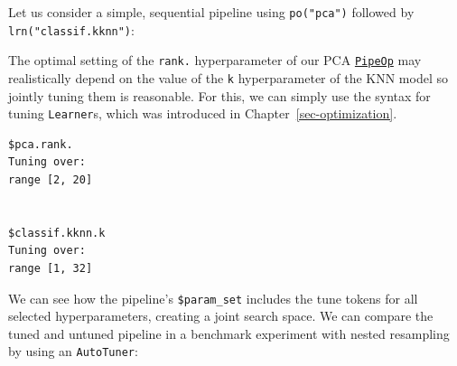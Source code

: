 Let us consider a simple, sequential pipeline using \texttt{po("pca")}
followed by \texttt{lrn("classif.kknn")}:

\begin{Shaded}
\begin{Highlighting}[]
\OtherTok{=} \NormalTok{(}\NormalTok{(}\NormalTok{) }\SpecialCharTok{\%\textgreater{}\textgreater{}\%} \NormalTok{(}\NormalTok{))}
\end{Highlighting}
\end{Shaded}

The optimal setting of the \texttt{rank.} hyperparameter of our PCA
\href{https://mlr3pipelines.mlr-org.com/reference/PipeOp.html}{\texttt{PipeOp}}
may realistically depend on the value of the \texttt{k} hyperparameter
of the KNN model so jointly tuning them is reasonable. For this, we can
simply use the syntax for tuning \texttt{Learner}s, which was introduced
in Chapter~\ref{sec-optimization}.

\begin{Shaded}
\begin{Highlighting}[]
\OtherTok{=} \NormalTok{(}\NormalTok{, } \NormalTok{(}\NormalTok{, }\NormalTok{))}
\OtherTok{=} \NormalTok{(}\NormalTok{, } \NormalTok{(}\NormalTok{, }\NormalTok{))}
\OtherTok{=} \SpecialCharTok{\%\textgreater{}\textgreater{}\%}
\SpecialCharTok{$}\SpecialCharTok{$}
\end{Highlighting}
\end{Shaded}

\begin{verbatim}
$pca.rank.
Tuning over:
range [2, 20]


$classif.kknn.k
Tuning over:
range [1, 32]
\end{verbatim}

We can see how the pipeline's \texttt{\$param\_set} includes the tune
tokens for all selected hyperparameters, creating a joint search space.
We can compare the tuned and untuned pipeline in a benchmark experiment
with nested resampling by using an \texttt{AutoTuner}:

